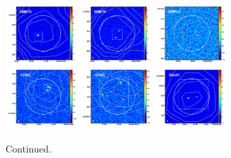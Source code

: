 \documentclass[iop]{emulateapj}
\begin{document}
\begin{figure}[!tbp]
\begin{centering}
\includegraphics[width=0.245\textwidth]{../Figures/overlays/XMM115_870_250.pdf}
\includegraphics[width=0.245\textwidth]{../Figures/overlays/XMM119_870_250.pdf}
\includegraphics[width=0.245\textwidth]{../Figures/overlays/XMM124_870_250.pdf}
\includegraphics[width=0.245\textwidth]{../Figures/overlays/COS01_870_250.pdf}
\includegraphics[width=0.245\textwidth]{../Figures/overlays/COS02_870_250.pdf}
\includegraphics[width=0.245\textwidth]{../Figures/overlays/ElaisS1_870_250.pdf}
\end{centering}

\caption{ Continued.}

\end{figure}
\end{document}
